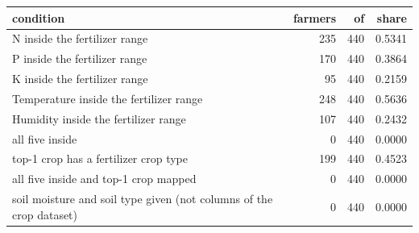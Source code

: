 \begin{tabular}{lrrr}
\toprule
condition & farmers & of & share \\
\midrule
N inside the fertilizer range & 235 & 440 & 0.5341 \\
P inside the fertilizer range & 170 & 440 & 0.3864 \\
K inside the fertilizer range & 95 & 440 & 0.2159 \\
Temperature inside the fertilizer range & 248 & 440 & 0.5636 \\
Humidity inside the fertilizer range & 107 & 440 & 0.2432 \\
all five inside & 0 & 440 & 0.0000 \\
top-1 crop has a fertilizer crop type & 199 & 440 & 0.4523 \\
all five inside and top-1 crop mapped & 0 & 440 & 0.0000 \\
soil moisture and soil type given (not columns of the crop dataset) & 0 & 440 & 0.0000 \\
\bottomrule
\end{tabular}
